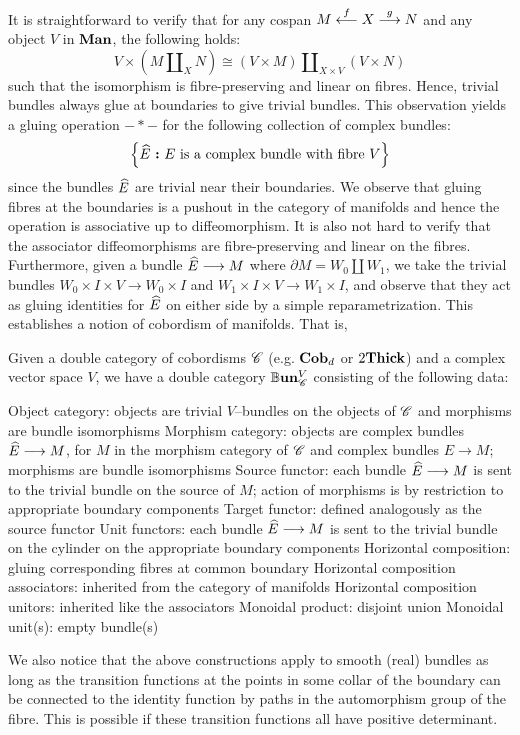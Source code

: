 \documentclass[./Thick_TQFTs_and_Quantum_Information.tex]{subfiles}
\begin{document}
It is straightforward to verify that for any cospan $M \ot[f] X \to[g] N$ and
any object $V$ in $\Man$, the following holds:
\[
  V \times (M \amalg_X N) \cong (V \times M) \amalg_{X \times V} (V \times N)
\]
such that the isomorphism is fibre-preserving and linear on fibres. Hence,
trivial bundles always glue at boundaries to give trivial bundles. This
observation yields a gluing operation $- * -$ for the following collection of
complex bundles:
\[
  \set[\wh{E}]{E \text{ is a complex bundle with fibre } V}
\]
since the bundles $\wh{E}$ are trivial near their boundaries. We observe that
gluing fibres at the boundaries is a pushout in the category of manifolds and
hence the operation is associative up to diffeomorphism. It is also not hard to
verify that the associator diffeomorphisms are fibre-preserving and linear on
the fibres. Furthermore, given a bundle $\wh{E} \to M$ where
$\partial M = W_0 \amalg W_1$, we take the trivial bundles
$W_0 \times I \times V \to W_0 \times I$ and
$W_1 \times I \times V \to W_1 \times I$, and observe that they act as gluing
identities for $\wh{E}$ on either side by a simple reparametrization. This
establishes a notion of cobordism of manifolds. That is,
\begin{thm}
Given a double category of cobordisms $\s{C}$ (e.g. $\Cob_d$ or $2\Thick$) and a
complex vector space $V$, we have a double category $\BBun^V_{\s{C}}$ consisting
of the following data:
\begin{enmrt}
\li Object category: objects are trivial $V$--bundles on the objects of $\s{C}$
and morphisms are bundle isomorphisms
\li Morphism category: objects are complex bundles $\wh{E} \to M$, for $M$ in
the morphism category of $\s{C}$ and complex bundles $E \to M$; morphisms are
bundle isomorphisms
\li Source functor: each bundle $\wh{E} \to M$ is sent to the trivial bundle on
the source of $M$; action of morphisms is by restriction to appropriate boundary
components
\li Target functor: defined analogously as the source functor
\li Unit functors: each bundle $\wh{E} \to M$ is sent to the trivial bundle on
the cylinder on the appropriate boundary components
\li Horizontal composition: gluing corresponding fibres at common boundary
\li Horizontal composition associators: inherited from the category of manifolds
\li Horizontal composition unitors: inherited like the associators
\li Monoidal product: disjoint union
\li Monoidal unit(s): empty bundle(s)
\end{enmrt}
\end{thm}

We also notice that the above constructions apply to smooth (real) bundles as
long as the transition functions at the points in some collar of the boundary
can be connected to the identity function by paths in the automorphism group of
the fibre. This is possible if these transition functions all have positive
determinant. 
\end{document}
